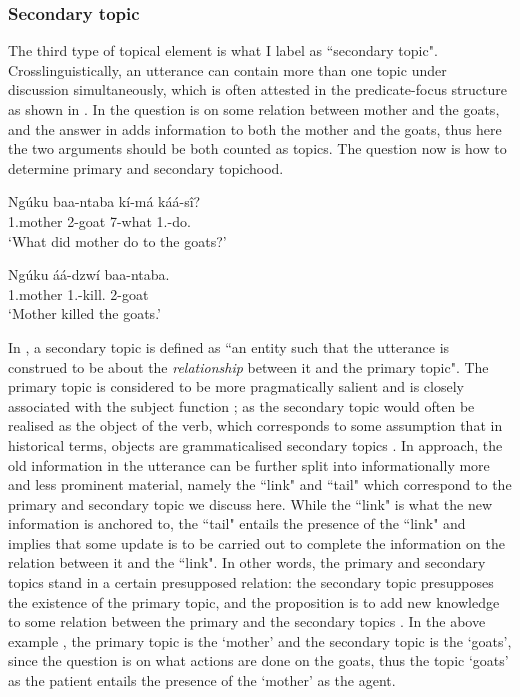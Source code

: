 \documentclass[output=paper,colorlinks,citecolor=brown,
]{langscibook}
\begin{document}
\subsubsection{Secondary topic}\label{teke:sec:4.1.3}
The third type of topical element is what I label as ``secondary topic". Crosslinguistically, an utterance can contain more than one topic under discussion simultaneously, which is often attested in the predicate-focus structure as shown in . In  the question is on some relation between mother and the goats, and the answer in  adds information to both the mother and the goats, thus here the two arguments should be both counted as topics. The question now is how to determine primary and secondary topichood.
\begin{exe}
    \ex \label{104}
    \begin{xlist}
\ex
\label{104a}
\gll
Ng\'{u}ku baa-ntaba kí-má káá-sî?\\
1.mother 2-goat 7-what 1\Sm{}.\Pst{}-do.\Pst{}\\
\trans ‘What did mother do to the goats?’

\ex
\label{104b}
\gll
Ng\'{u}ku áá-dzwí baa-ntaba.\\
1.mother 1\Sm{}.\Pst{}-kill.\Pst{} 2-goat\\
\trans ‘Mother killed the goats.’

    \end{xlist}
\end{exe}
In \citet{Nikolaeva2001}, a secondary topic is defined as ``an entity such that the utterance is construed to be about the \textit{relationship} between it and the primary topic". The primary topic is considered to be more pragmatically salient and is closely associated with the subject function \citep{DalrympleNikolaeva2011}; as the secondary topic would often be realised as the object of the verb, which corresponds to some assumption that in historical terms, objects are grammaticalised secondary topics \citep{Givón1984, Givón1990, Givón2001}. In  approach, the old information in the utterance can be further split into informationally more and less prominent material, namely the ``link" and ``tail" which correspond to the primary and secondary topic we discuss here. While the ``link" is what the new information is anchored to, the ``tail" entails the presence of the ``link" and implies that some update is to be carried out to complete the information on the relation between it and the ``link". In other words, the primary and secondary topics stand in a certain presupposed relation: the secondary topic presupposes the existence of the primary topic, and the proposition is to add new knowledge to some relation between the primary and the secondary topics \citep{DalrympleNikolaeva2011}. In the above example , the primary topic is the `mother' and the secondary topic is the `goats', since the question is on what actions are done on the goats, thus the topic `goats' as the patient entails the presence of the `mother' as the agent.
\end{document}
